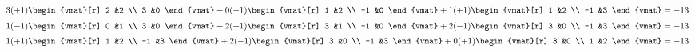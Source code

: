 \begin{Answer}
\Question \( 3(+1)\begin{vmat}[r]
                          2  &2  \\
                          3  &0
                       \end{vmat}
                 +0(-1)\begin{vmat}[r]
                          1  &2  \\
                         -1  &0
                       \end{vmat}
                 +1(+1)\begin{vmat}[r]
                          1  &2  \\
                         -1  &3
                       \end{vmat} =-13 \)
\Question \( 1(-1)\begin{vmat}[r]
                          0  &1  \\
                          3  &0
                       \end{vmat}
                 +2(+1)\begin{vmat}[r]
                          3  &1  \\
                         -1  &0
                       \end{vmat}
                 +2(-1)\begin{vmat}[r]
                          3  &0  \\
                         -1  &3
                       \end{vmat} =-13 \)
\Question \( 1(+1)\begin{vmat}[r]
                          1  &2  \\
                         -1  &3
                       \end{vmat}
                 +2(-1)\begin{vmat}[r]
                          3  &0  \\
                         -1  &3
                       \end{vmat}
                 +0(+1)\begin{vmat}[r]
                          3  &0  \\
                          1  &2
                       \end{vmat} =-13 \)

\end{Answer}
